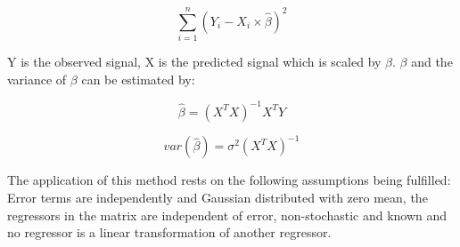 \begin{equation}
\sum_{i=1}^{n}(Y_i-X_i\times\hat{\beta})^2
\end{equation}  

Y is the observed signal, X is the predicted signal which is scaled by $\beta$. $\beta$ and the variance of $\beta$ can be estimated by: 

\begin{equation}
\hat{\beta}=(X^TX)^{-1}X^TY
\end{equation}

\begin{equation}
var(\hat{\beta})=\sigma^2(X^TX)^{-1}
\end{equation}

The application of this method rests on the following assumptions being fulfilled: Error terms are independently and Gaussian distributed with zero mean, the regressors in the matrix are independent of error, non-stochastic and known and no regressor is a linear transformation of another regressor. \cite{Monti2011}    




